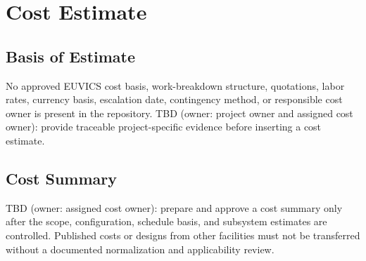 \section{Cost Estimate}

\subsection{Basis of Estimate}

No approved EUVICS cost basis, work-breakdown structure, quotations, labor rates,
currency basis, escalation date, contingency method, or responsible cost owner is
present in the repository. TBD (owner: project owner and assigned cost owner):
provide traceable project-specific evidence before inserting a cost estimate.

\subsection{Cost Summary}

TBD (owner: assigned cost owner): prepare and approve a cost summary only after
the scope, configuration, schedule basis, and subsystem estimates are controlled.
Published costs or designs from other facilities must not be transferred without
a documented normalization and applicability review.
